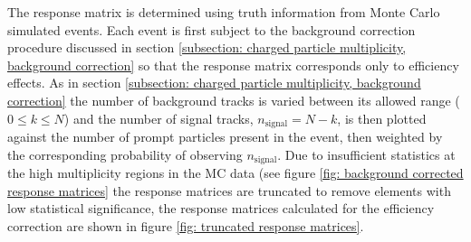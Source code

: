 The response matrix is determined using truth information from Monte Carlo simulated events. Each event is first subject to the background correction procedure discussed in section \ref{subsection: charged particle multiplicity, background correction} so that the response matrix corresponds only to efficiency effects. As in section \ref{subsection: charged particle multiplicity, background correction} the number of background tracks is varied between its allowed range ($0 \le k \le N$) and the number of signal tracks, $n_\mathrm{signal} = N - k$, is then plotted against the number of prompt particles present in the event, then weighted by the corresponding probability of observing $n_\mathrm{signal}$. Due to insufficient statistics at the high multiplicity regions in the MC data (see figure \ref{fig: background corrected response matrices} the response matrices are truncated to remove elements with low statistical significance, the response matrices calculated for the efficiency correction are shown in figure \ref{fig: truncated response matrices}.

